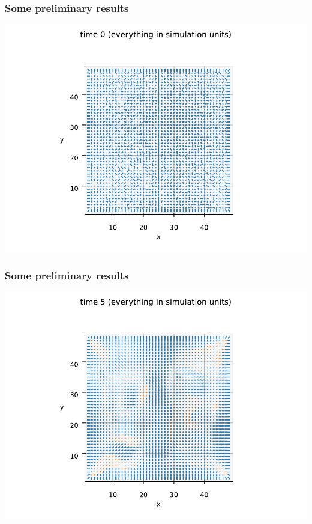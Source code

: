 \documentclass[10pt,mathserif]{beamer}
\begin{document}
\begin{frame}
    \frametitle{Some preliminary results}
    \begin{center}
        \includegraphics[width=\textwidth]{figures/prelim0.pdf}
    \end{center}
\end{frame}

\begin{frame}
    \frametitle{Some preliminary results}
    \begin{center}
        \includegraphics[width=\textwidth]{figures/prelim1.pdf}
    \end{center}
\end{frame}
\end{document}
